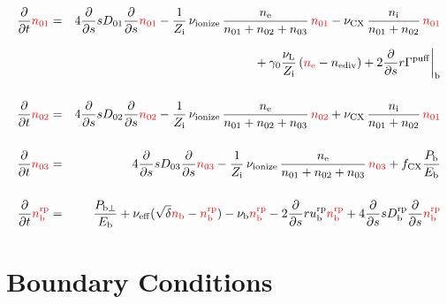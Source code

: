 \documentclass[11pt]{article}
\def\r#1{{\rm#1}}
\def\ddt{\frac{\partial}{\partial t}}
\def\dds{\frac{\partial}{\partial s}}
\def\nee{n_\r{e}}
\def\ni{n_\r{i}}
\def\nb{n_\r{b}}
\def\nna{n_{01}}
\def\nnb{n_{02}}
\def\nnc{n_{03}}
\def\Zi{Z_\r{i}}
\def\Pb{P_\r{b}}
\def\Eb{E_\r{b}}
\def\nbrp{n_\r{b}^\r{rp}}
\def\Pbperp{P_{\r{b}\perp}}
\def\nueff{\nu_\r{eff}}
\def\ubrp{u_\r{b}^\r{rp}}
\def\Dbrp{D_\r{b}^\r{rp}}
\def\fCX{f_\r{CX}}
\def\nuL{\nu_\r{L}}
\def\nuCX{\nu_\r{CX}}
\def\nuion{\nu_\r{ionize}}
\def\nub{\nu_\r{b}}
\def\nediv{n_\r{ediv}}
\def\red#1{\textcolor{red}{#1}}
\begin{document}
\begin{eqnarray}
  \ddt \red{\nna} &=& 
%
    4 \dds s D_{01} \dds \red{\nna}
%
  - \frac{1}{\Zi}\, \nuion\, \frac{\nee}{\nna + \nnb + \nnc}\, \red{\nna}
%
  - \nuCX\, \frac{\ni}{\nna + \nnb}\, \red{\nna}
\nonumber\\[2.5mm]&&{}
%
  + \gamma_0 \frac{\nuL}{\Zi} \, (\red{\nee} - \nediv)
%
  + 2 \dds r \Gamma^\r{puff}\biggr|_\r{b}
\\[5mm]
  \ddt \red{\nnb} &=& 
%
    4 \dds s D_{02} \dds \red{\nnb}
%
  - \frac{1}{\Zi}\, \nuion\, \frac{\nee}{\nna + \nnb + \nnc}\, \red{\nnb}
%
  + \nuCX\, \frac{\ni}{\nna + \nnb}\, \red{\nna}
%
\\[5mm]
  \ddt \red{\nnc} &=& 
%
    4 \dds s D_{03} \dds \red{\nnc}
%
  - \frac{1}{\Zi}\, \nuion\, \frac{\nee}{\nna + \nnb + \nnc}\, \red{\nnc}
%
  + \fCX \frac{\Pb}{\Eb}
\\[5mm]
  \ddt \red{\nbrp} &=&
%
    \frac{\Pbperp}{\Eb}
%
  + \nueff (\sqrt{\delta} \red{\nb} - \red{\nbrp})
%
  - \nub \red{\nbrp}
%
  - 2 \dds r \ubrp \red{\nbrp} + 4 \dds s \Dbrp \dds \red{\nbrp}
%
\end{eqnarray}

\bigskip

\section{Boundary Conditions}
\end{document}
